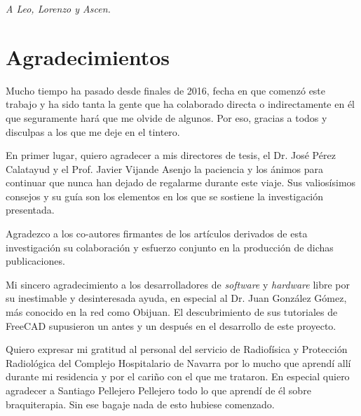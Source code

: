 \newpage
\thispagestyle{empty}
\begin{flushright}
    \emph{A Leo, Lorenzo y Ascen.}
\end{flushright}


\newpage
\thispagestyle{empty}
\begin{flushright}
\end{flushright}


\begin{flushright}
\hypertarget{Agradecimientos}{%
\chapter*{Agradecimientos}\label{agradecimientos}}


\justify
Mucho tiempo ha pasado desde finales de 2016, fecha en que comenzó este trabajo y ha sido tanta la gente que ha colaborado directa o indirectamente en él que seguramente hará que me olvide de algunos. Por eso, gracias a todos y disculpas a los que me deje en el tintero.

En primer lugar, quiero agradecer a mis directores de tesis, el Dr. José Pérez Calatayud y el Prof. Javier Vijande Asenjo la paciencia y los ánimos para continuar que nunca han dejado de regalarme durante este viaje. Sus valiosísimos consejos y su guía son los elementos en los que se sostiene la investigación presentada.         

Agradezco a los co-autores firmantes de los artículos derivados de esta investigación su colaboración y esfuerzo conjunto en la producción de dichas publicaciones.

Mi sincero agradecimiento a los desarrolladores de \textit{software} y \textit{hardware} libre por su inestimable y desinteresada ayuda, en especial al Dr. Juan González Gómez, más conocido en la red como Obijuan. El descubrimiento de sus tutoriales de FreeCAD supusieron un antes y un después en el desarrollo de este proyecto.   

Quiero expresar mi gratitud al personal del servicio de Radiofísica y Protección Radiológica del Complejo Hospitalario de Navarra por lo mucho que aprendí allí durante mi residencia y por el cariño con el que me trataron. En especial quiero agradecer a Santiago Pellejero Pellejero todo lo que aprendí de él sobre braquiterapia. Sin ese bagaje nada de esto hubiese comenzado.


\end{flushright}
